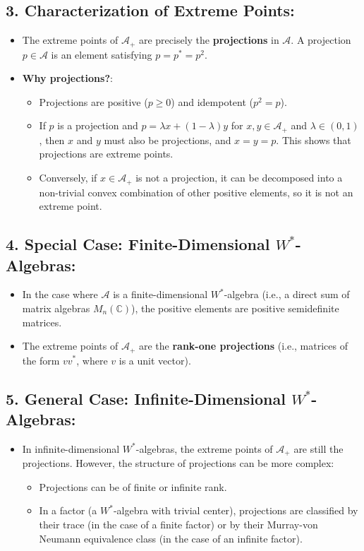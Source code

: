\documentclass{article}
\begin{document}
\subsection*{3. Characterization of Extreme Points:}
\begin{itemize}
    \item The extreme points of \( \mathcal{A}_+ \) are precisely the \textbf{projections} in \( \mathcal{A} \). A projection \( p \in \mathcal{A} \) is an element satisfying \( p = p^* = p^2 \).
    \item \textbf{Why projections?}:
    \begin{itemize}
        \item Projections are positive (\( p \geq 0 \)) and idempotent (\( p^2 = p \)).
        \item If \( p \) is a projection and \( p = \lambda x + (1 - \lambda) y \) for \( x, y \in \mathcal{A}_+ \) and \( \lambda \in (0, 1) \), then \( x \) and \( y \) must also be projections, and \( x = y = p \). This shows that projections are extreme points.
        \item Conversely, if \( x \in \mathcal{A}_+ \) is not a projection, it can be decomposed into a non-trivial convex combination of other positive elements, so it is not an extreme point.
    \end{itemize}
\end{itemize}

\subsection*{4. Special Case: Finite-Dimensional \( W^* \)-Algebras:}
\begin{itemize}
    \item In the case where \( \mathcal{A} \) is a finite-dimensional \( W^* \)-algebra (i.e., a direct sum of matrix algebras \( M_n(\mathbb{C}) \)), the positive elements are positive semidefinite matrices.
    \item The extreme points of \( \mathcal{A}_+ \) are the \textbf{rank-one projections} (i.e., matrices of the form \( vv^* \), where \( v \) is a unit vector).
\end{itemize}

\subsection*{5. General Case: Infinite-Dimensional \( W^* \)-Algebras:}
\begin{itemize}
    \item In infinite-dimensional \( W^* \)-algebras, the extreme points of \( \mathcal{A}_+ \) are still the projections. However, the structure of projections can be more complex:
    \begin{itemize}
        \item Projections can be of finite or infinite rank.
        \item In a factor (a \( W^* \)-algebra with trivial center), projections are classified by their trace (in the case of a finite factor) or by their Murray-von Neumann equivalence class (in the case of an infinite factor).
    \end{itemize}
\end{itemize}
\end{document}
